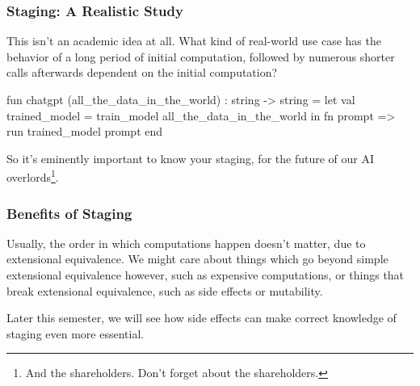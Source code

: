 \documentclass[aspectratio=169]{beamer}
\begin{document}
\begin{frame}[fragile]
  \frametitle{Staging: A Realistic Study}

  This isn't an academic idea at all. What kind of real-world use case
  has the behavior of a long period of initial computation, followed
  by numerous shorter calls afterwards dependent on the initial
  computation?

  \pause
  \vspace{\fill}

  \begin{codeblock}
    fun chatgpt (all_the_data_in_the_world) : string -> string =
      let
        val trained_model = train_model all_the_data_in_the_world
      in
        fn prompt => run trained_model prompt
      end
  \end{codeblock}

  \pause
  \vspace{\fill}

  So it's eminently important to know your staging, for the future
  of our AI overlords\footnote{And the shareholders. Don't forget about
  the shareholders.}.

\end{frame}



\begin{frame}[fragile]
  \frametitle{Benefits of Staging}

  Usually, the order in which computations happen doesn't matter, due to extensional
  equivalence. We might care about things which go beyond simple extensional equivalence
  however, such as expensive computations, or things that break extensional equivalence,
  such as side effects or mutability.

  \pause
  \vspace{\fill}

  Later this semester, we will see how side effects can make correct knowledge of staging
  even more essential.
\end{frame}

\end{document}
